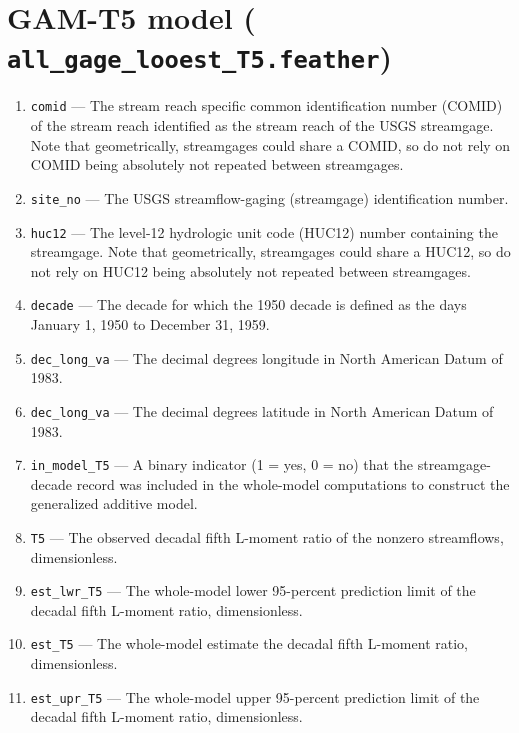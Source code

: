 \documentclass[1p, authoryear, 11pt, times, preprint]{elsarticle}
\newcommand{\code}[1]{{\color{black}%
                       \mbox{\lstinline[basicstyle={\small\ttfamily},
                                        keywordstyle=\scriptsize\ttfamily]|#1|}}}
\begin{document}


\section{GAM-T5 model (\code{all_gage_looest_T5.feather})}
\begin{enumerate}
\footnotesize
\RaggedRight
\item \code{comid} --- The stream reach specific common identification number (COMID) of the stream reach identified as the stream reach of the USGS streamgage. Note that geometrically, streamgages could share a COMID, so do not rely on COMID being absolutely not repeated between streamgages.
\item \code{site_no} --- The USGS streamflow-gaging (streamgage) identification number.
\item \code{huc12} --- The level-12 hydrologic unit code (HUC12) number containing the streamgage. Note that geometrically, streamgages could share a HUC12, so do not rely on HUC12 being absolutely not repeated between streamgages.
\item \code{decade} --- The decade for which the 1950 decade is defined as the days January 1, 1950 to December 31, 1959.
\item \code{dec_long_va} --- The decimal degrees longitude in North American Datum of 1983.
\item \code{dec_long_va} --- The decimal degrees latitude in North American Datum of 1983.
\item \code{in_model_T5} --- A binary indicator (1 = yes, 0 = no) that the streamgage-decade record was included in the whole-model computations to construct the generalized additive model.
\item \code{T5} --- The observed decadal fifth L-moment ratio of the nonzero streamflows, dimensionless.
\item \code{est_lwr_T5} --- The whole-model lower 95-percent prediction limit of the decadal fifth L-moment ratio, dimensionless.
\item \code{est_T5} --- The whole-model estimate the decadal fifth L-moment ratio, dimensionless.
\item \code{est_upr_T5} --- The whole-model upper 95-percent prediction limit of the decadal fifth L-moment ratio, dimensionless.

\end{enumerate}
\end{document}
